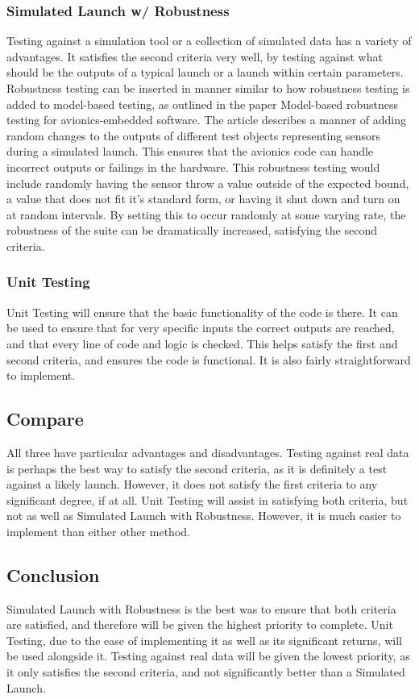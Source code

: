 \documentclass[onecolumn, draftclsnofoot,10pt, compsoc]{IEEEtran}
\begin{document}
\subsubsection{Simulated Launch w/ Robustness}
Testing against a simulation tool or a collection of simulated data has a variety of advantages. It satisfies the second criteria very well, by testing against what should be the outputs of a typical launch or a launch within certain parameters. Robustness testing can be inserted in manner similar to how robustness testing is added to model-based testing, as outlined in the paper Model-based robustness testing for avionics-embedded software\cite{site5}. The article describes a manner of adding random changes to the outputs of different test objects representing sensors during a simulated launch. This ensures that the avionics code can handle incorrect outputs or failings in the hardware. This robustness testing would include randomly having the sensor throw a value outside of the expected bound, a value that does not fit it's standard form, or having it shut down and turn on at random intervals. By setting this to occur randomly at some varying rate, the robustness of the suite can be dramatically increased, satisfying the second criteria.
\subsubsection{Unit Testing}
Unit Testing will ensure that the basic functionality of the code is there. It can be used to ensure that for very specific inputs the correct outputs are reached, and that every line of code and logic is checked. This helps satisfy the first and second criteria, and ensures the code is functional. It is also fairly straightforward to implement.
\subsection{Compare}
All three have particular advantages and disadvantages. Testing against real data is perhaps the best way to satisfy the second criteria, as it is definitely a test against a likely launch. However, it does not satisfy the first criteria to any significant degree, if at all. Unit Testing will assist in satisfying both criteria, but not as well as Simulated Launch with Robustness. However, it is much easier to implement than either other method.
\subsection{Conclusion}
Simulated Launch with Robustness is the best was to ensure that both criteria are satisfied, and therefore will be given the highest priority to complete. Unit Testing, due to the ease of implementing it as well as its significant returns, will be used alongside it. Testing against real data will be given the lowest priority, as it only satisfies the second criteria, and not significantly better than a Simulated Launch.



\end{document}
